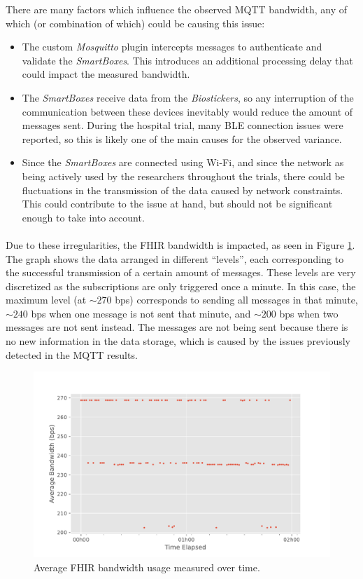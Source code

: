 There are many factors which influence the observed \acs{MQTT} bandwidth, any of which (or combination of which) could be causing this issue:

\begin{itemize}
    \item The custom \textit{Mosquitto} plugin intercepts messages to authenticate and validate the \textit{SmartBoxes}. This introduces an additional processing delay that could impact the measured bandwidth.
    \item The \textit{SmartBoxes} receive data from the \textit{Biostickers}, so any interruption of the communication between these devices inevitably would reduce the amount of messages sent. During the hospital trial, many \acs{BLE} connection issues were reported, so this is likely one of the main causes for the observed variance.
    \item Since the \textit{SmartBoxes} are connected using Wi-Fi, and since the network as being actively used by the researchers throughout the trials, there could be fluctuations in the transmission of the data caused by network constraints. This could contribute to the issue at hand, but should not be significant enough to take into account.
\end{itemize}

\paragraph{} Due to these irregularities, the \acs{FHIR} bandwidth is impacted, as seen in Figure \ref{fig:pilot-fhir-bandwidth}. The graph shows the data arranged in different ``levels'', each corresponding to the successful transmission of a certain amount of messages. These levels are very discretized as the subscriptions are only triggered once a minute. In this case, the maximum level (at $\sim 270$ bps) corresponds to sending all messages in that minute, $\sim 240$ bps when one message is not sent that minute, and $\sim 200$ bps when two messages are not sent instead. The messages are not being sent because there is no new information in the data storage, which is caused by the issues previously detected in the \acs{MQTT} results.

\begin{figure}[H]
    \centering
    \includegraphics[width=0.85\linewidth]{images/PILOTfhir_bandwidth.pdf}
    \caption{Average \acs{FHIR} bandwidth usage measured over time.}
    \label{fig:pilot-fhir-bandwidth}
\end{figure}

